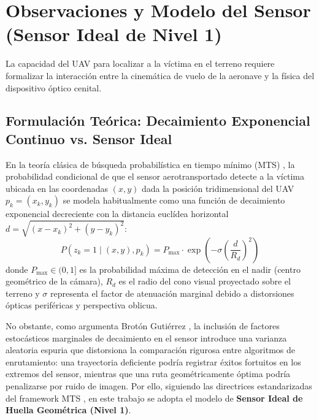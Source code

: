 \section{Observaciones y Modelo del Sensor (Sensor Ideal de Nivel 1)}

La capacidad del UAV para localizar a la víctima en el terreno requiere formalizar la interacción entre la cinemática de vuelo de la aeronave y la física del dispositivo óptico cenital.

\subsection{Formulación Teórica: Decaimiento Exponencial Continuo vs. Sensor Ideal}

En la teoría clásica de búsqueda probabilística en tiempo mínimo (MTS) \cite{lanillos-bayesian}, la probabilidad condicional de que el sensor aerotransportado detecte a la víctima ubicada en las coordenadas $(x,y)$ dada la posición tridimensional del UAV $p_k = (x_k, y_k)$ se modela habitualmente como una función de decaimiento exponencial decreciente con la distancia euclídea horizontal $d = \sqrt{(x - x_k)^2 + (y - y_k)^2}$:
\begin{equation}
    P(z_k = 1 \mid (x,y), p_k) = P_{\max} \cdot \exp\left( -\sigma \left( \frac{d}{R_d} \right)^2 \right)
\end{equation}
donde $P_{\max} \in (0, 1]$ es la probabilidad máxima de detección en el nadir (centro geométrico de la cámara), $R_d$ es el radio del cono visual proyectado sobre el terreno y $\sigma$ representa el factor de atenuación marginal debido a distorsiones ópticas periféricas y perspectiva oblicua.

No obstante, como argumenta Brotón Gutiérrez \cite{broton2025revision}, la inclusión de factores estocásticos marginales de decaimiento en el sensor introduce una varianza aleatoria espuria que distorsiona la comparación rigurosa entre algoritmos de enrutamiento: una trayectoria deficiente podría registrar éxitos fortuitos en los extremos del sensor, mientras que una ruta geométricamente óptima podría penalizarse por ruido de imagen. Por ello, siguiendo las directrices estandarizadas del framework MTS \cite{Broton_Gutierrez_MTS-UncertainEnvironment, broton2025revision}, en este trabajo se adopta el modelo de \textbf{Sensor Ideal de Huella Geométrica (Nivel 1)}.

